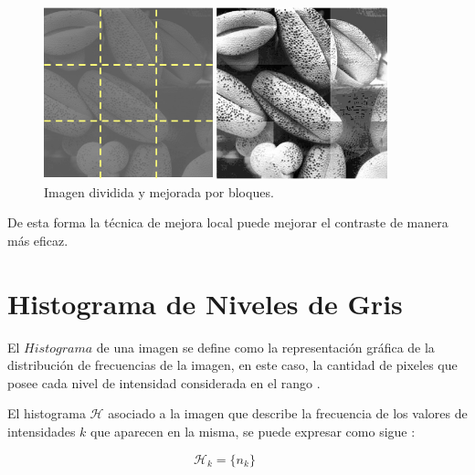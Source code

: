 \begin{figure}[H]
    \centering
        \includegraphics[width=10cm]{ej_imagen_bloques.png}    
        \caption{Imagen dividida y mejorada por bloques.}
    \label{imagenes_bloques}
\end{figure}

De esta forma la técnica de mejora local puede mejorar el contraste de manera más eficaz.



\section{Histograma de Niveles de Gris}

El $Histograma$ de una imagen se define como la representación gráfica de la distribución de frecuencias de la imagen, en este caso, la cantidad de pixeles que posee cada nivel de intensidad considerada en el rango \cite{SMG11}.

El histograma $\mathcal{H}$ asociado a la imagen que describe la frecuencia de los valores de intensidades $k$ que aparecen en la misma, se puede expresar como sigue \cite{kwok2013}:

\begin{equation}
    \label{ecuacion_histograma}
    \mathcal H_{k} = \lbrace n_k \rbrace \qquad %
\end{equation}

